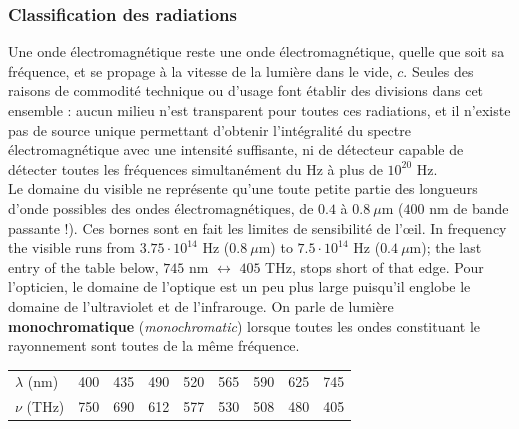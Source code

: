 \subsubsection{Classification des radiations}

Une onde électromagnétique reste une onde électromagnétique, quelle que soit sa
fréquence, et se propage à la vitesse de la lumière dans le vide, $c$. Seules des
raisons de commodité technique ou d'usage font établir des divisions dans cet
ensemble : aucun milieu n'est transparent pour toutes ces radiations, et il
n'existe pas de source unique permettant d'obtenir l'intégralité du spectre
électromagnétique avec une intensité suffisante, ni de détecteur capable de
détecter toutes les fréquences simultanément du Hz à plus de $10^{20}$ Hz.\\

Le domaine du visible ne représente qu'une toute petite partie des longueurs
d'onde possibles des ondes électromagnétiques, de $0.4$ à $0.8\ \mu$m ($400$ nm
de bande passante !). Ces bornes sont en fait les limites de sensibilité de
l'œil. In frequency the visible runs from $3.75\cdot 10^{14}$ Hz ($0.8\ \mu$m)
to $7.5\cdot 10^{14}$ Hz ($0.4\ \mu$m); the last entry of the table below,
$745$ nm $\leftrightarrow$ $405$ THz, stops short of that edge. Pour
l'opticien, le domaine de l'optique est un peu plus large puisqu'il englobe le
domaine de l'ultraviolet et de l'infrarouge. On parle de lumière
\textbf{monochromatique} (\textit{monochromatic}) lorsque toutes les ondes
constituant le rayonnement sont toutes de la même fréquence.

\begin{center}
  \small
  \begin{tabular}{lcccccccc}
    \toprule
    $\lambda$ (nm) & 400 & 435 & 490 & 520 & 565 & 590 & 625 & 745 \\
    $\nu$ (THz)    & 750 & 690 & 612 & 577 & 530 & 508 & 480 & 405 \\
    \bottomrule
  \end{tabular}
\end{center}

